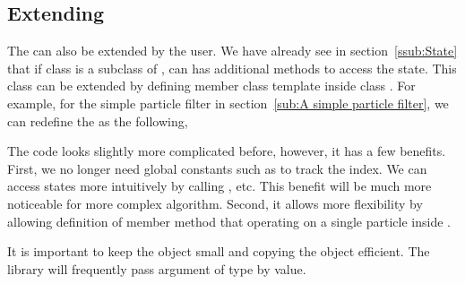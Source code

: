 \subsection{Extending \protect\spt}
\label{sub:Extending SPT}

The  can also be extended by the user. We have
already see in section~\ref{ssub:State} that if class  is a
subclass of ,  can has
additional methods to access the state. This class can be extended by defining
member class template inside class . For example, for the simple
particle filter in section~\ref{sub:A simple particle filter}, we can redefine
the  as the following,

The code looks slightly more complicated before, however, it has a few
benefits. First, we no longer need global constants such as  to
track the index. We can access states more intuitively by calling
, etc. This benefit will be much more noticeable for more
complex algorithm. Second, it allows more flexibility by allowing definition of
member method that operating on a single particle inside
.

It is important to keep the object small and copying the object efficient. The
library will frequently pass argument of  type by
value.
